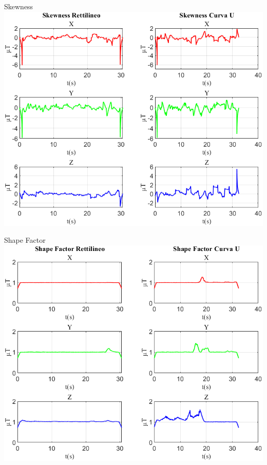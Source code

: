 \documentclass[beamer]{standalone}
\begin{document}
	\begin{frame}{{Skewness}}
		\centering\includegraphics[height=.8\textheight]{figure/Mag/Skewness}
	\end{frame}
	
	\begin{frame}{{Shape Factor}}
		\centering\includegraphics[height=.8\textheight]{figure/Mag/Shape Factor}
	\end{frame}
	
\end{document}
